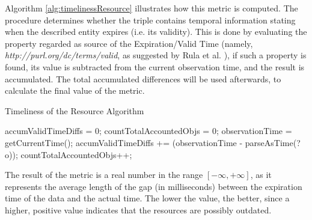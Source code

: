 Algorithm \ref{alg:timelinessResource} illustrates how this metric is computed. The procedure determines whether the triple contains  temporal information stating when the described entity expires (i.e. its validity). This is done by evaluating the property regarded as source  of the Expiration/Valid Time (namely, \textit{http://purl.org/dc/terms/valid}, as suggested by Rula et al. \cite{Rula2012}), if such a property is found, its value is subtracted from the current observation time, and the result is accumulated. The total accumulated differences will be used afterwards, to calculate the final value of the metric.
\begin{algorithm}
\caption{Timeliness of the Resource Algorithm} \label{alg:timelinessResource}
\begin{algorithmic}[1]
\State accumValidTimeDiffs = 0;
\State countTotalAccountedObjs = 0;
\State observationTime = getCurrentTime();
\EndProcedure
{}
\State accumValidTimeDiffs += (observationTime - parseAsTime(?o));
\State countTotalAccountedObjs++;
\EndIf
{}
\EndProcedure
\end{algorithmic}
\end{algorithm}
The result of the metric is a real number in the range $[-\infty, +\infty]$, as it represents the average length of the gap (in  milliseconds) between the expiration time of the data and the actual time. The lower the value, the better, since a higher, positive value indicates that the resources are possibly outdated.


